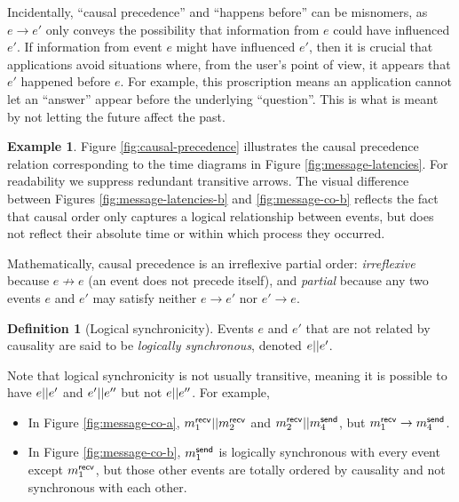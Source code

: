 \documentclass[]             %
{NASA}                       %
\theoremstyle{definition}
\newtheorem{example}[theorem]{Example}
\newtheorem{definition}[theorem]{Definition}
\begin{document}
Incidentally, ``causal precedence'' and ``happens before'' can be
misnomers, as $e \to e'$ only conveys the possibility that information
from $e$ could have influenced $e'$. If information from event $e$
might have influenced $e'$, then it is crucial that applications avoid
situations where, from the user's point of view, it appears that $e'$
happened before $e$. For example, this proscription means an
application cannot let an ``answer'' appear before the underlying
``question''. This is what is meant by not letting the future affect
the past.

\begin{example}
  Figure \ref{fig:causal-precedence} illustrates the causal precedence
  relation corresponding to the time diagrams in Figure
  \ref{fig:message-latencies}. For readability we suppress redundant
  transitive arrows. The visual difference between Figures
  \ref{fig:message-latencies-b} and \ref{fig:message-co-b} reflects
  the fact that causal order only captures a logical relationship
  between events, but does not reflect their absolute time or within
  which process they occurred.
\end{example}

Mathematically, causal precedence is an irreflexive partial order:
\emph{irreflexive} because $e \not \to e$ (an event does not precede
itself), and \emph{partial} because any two events $e$ and $e'$ may
satisfy neither $e \to e'$ nor $e' \to e$.

\begin{definition}[Logical synchronicity]
  \label{def:logically-synchronous}
  Events $e$ and $e'$ that are not related by causality are said to be
  \emph{logically synchronous}, denoted $e || e'$.
\end{definition}

Note that
logical synchronicity is not usually transitive, meaning it is
possible to have $e || e'$ and $e' || e''$ but not
$e || e''$. For example,
\begin{itemize}
\item In Figure \ref{fig:message-co-a}, $m_{1}^{\mathsf{recv}} || m_{2}^{\mathsf{recv}}$
  and $m_{2}^{\mathsf{recv}} || m_{4}^{\mathsf{send}}$, but $m_{1}^{\mathsf{recv}} \to m_{4}^{\mathsf{send}}$.
\item In Figure \ref{fig:message-co-b}, $m_{1}^{\mathsf{send}}$ is logically synchronous
with every event except $m_{1}^{\mathsf{recv}}$, but those other events are
totally ordered by causality and not synchronous with each
other.
\end{itemize}
\end{document}
